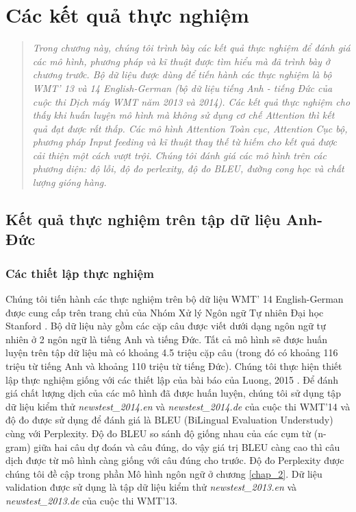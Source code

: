 \chapter{Các kết quả thực nghiệm}
\ifpdf
    \graphicspath{{Chapter4/Chapter4Figs/PNG/}{Chapter4/Chapter4Figs/PDF/}{Chapter4/Chapter4Figs/}}
\else
    \graphicspath{{Chapter4/Chapter4Figs/EPS/}{Chapter4/Chapter4Figs/}}
\fi
\label{chap_4}
\begin{quote}
\textit{Trong chương này, chúng tôi trình bày các kết quả thực nghiệm để đánh giá các mô hình, phương pháp và kĩ thuật được tìm hiểu mà đã trình bày ở chương trước. Bộ dữ liệu được dùng để tiến hành các thực nghiệm là bộ WMT' 13 và 14 English-German (bộ dữ liệu tiếng Anh - tiếng Đức của cuộc thi Dịch máy WMT năm 2013 và 2014). Các kết quả thực nghiệm cho thấy khi huấn luyện mô hình mà không sử dụng cơ chế Attention thì kết quả đạt được rất thấp. Các mô hình Attention Toàn cục, Attention Cục bộ, phương pháp Input feeding và kĩ thuật thay thế từ hiếm cho kết quả được cải thiện một cách vượt trội. Chúng tôi đánh giá các mô hình trên các phương diện: độ lỗi, độ đo perlexity, độ đo BLEU, đường cong học và chất lượng gióng hàng.}
\end{quote}
\section{Kết quả thực nghiệm trên tập dữ liệu Anh-Đức}
\subsection{Các thiết lập thực nghiệm}
Chúng tôi tiến hành các thực nghiệm trên bộ dữ liệu WMT' 14 English-German được cung cấp trên trang chủ của Nhóm Xử lý Ngôn ngữ Tự nhiên Đại học Stanford \cite{StanfordNMT}. Bộ dữ liệu này gồm các cặp câu được viết dưới dạng ngôn ngữ tự nhiên ở 2 ngôn ngữ là tiếng Anh và tiếng Đức. Tất cả mô hình sẽ được huấn luyện trên tập dữ liệu mà có khoảng 4.5 triệu cặp câu (trong đó có khoảng 116 triệu từ tiếng Anh và khoảng 110 triệu từ tiếng Đức). Chúng tôi thực hiện thiết lập thực nghiệm giống với các thiết lập của bài báo của Luong, 2015 \cite{attentionThangLuong2015}. Để đánh giá chất lượng dịch của các mô hình đã được huấn luyện, chúng tôi sử dụng tập dữ liệu kiểm thử \textit{newstest\_2014.en} và \textit{newstest\_2014.de} của cuộc thi WMT'14 và độ đo được sử dụng để đánh giá là BLEU (BiLingual Evaluation Understudy) \cite{BLEUpaper} cùng với Perplexity. Độ đo BLEU so sánh độ giống nhau của các cụm từ (n-gram) giữa hai câu dự đoán và câu đúng, do vậy giá trị BLEU càng cao thì câu dịch được từ mô hình càng giống với câu đúng cho trước. Độ đo Perplexity được chúng tôi đề cập trong phần Mô hình ngôn ngữ ở chương \ref{chap_2}. Dữ liệu validation được sử dụng là tập dữ liệu kiểm thử \textit{newstest\_2013.en} và \textit{newstest\_2013.de} của cuộc thi WMT'13.

